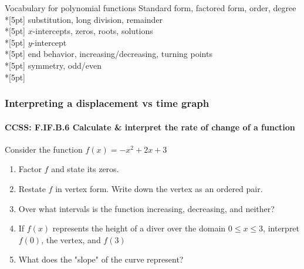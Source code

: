 \documentclass{beamer}
\begin{document}
\begin{frame}{Vocabulary for polynomial functions}
    Standard form, factored form, order, degree\\*[5pt]
    substitution, long division, remainder\\*[5pt]
    $x$-intercepts, zeros, roots, solutions\\*[5pt]
    $y$-intercept\\*[5pt]
    end behavior, increasing/decreasing, turning points\\*[5pt]
    symmetry, odd/even\\*[5pt]
\end{frame}

\frame
{
  \frametitle{Interpreting a displacement vs time graph}
  \framesubtitle{CCSS: F.IF.B.6 Calculate \& interpret the rate of change of a function}

  \begin{block}{Consider the function $f(x)=-x^2+2x+3$}
  \begin{enumerate}
      \item Factor $f$ and state its zeros.
      \item Restate $f$ in vertex form. Write down the vertex as an ordered pair.
      \item Over what intervals is the function increasing, decreasing, and neither?
      \item If $f(x)$ represents the height of a diver over the domain $0 \leq x \leq 3$, interpret $f(0)$, the vertex, and $f(3)$
      \item What does the "slope" of the curve represent?
  \end{enumerate}
  \end{block}
}
\end{document}
